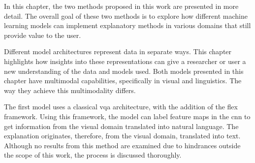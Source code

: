 \label{sec:3_methodology}

In this chapter, the two methods proposed in this work are presented in more detail. The overall goal of these two methods is to explore how different machine learning models can implement explanatory methods in various domains that still provide value to the user. 

Different model architectures represent data in separate ways. 
This chapter highlights how insights into these representations can give a researcher or user a new understanding of the data and models used.
Both models presented in this chapter have multimodal capabilities, specifically in visual and linguistics. The way they achieve this multimodality differs. 

The first model uses a classical \gls{vqa} architecture, with the addition of the \gls{flex} framework. 
Using this framework, the model can label feature maps in the \gls{cnn} to get information from the visual domain translated into natural language. The explanation originates, therefore, from the visual domain, translated into text. Although no results from this method are examined due to hindrances outside the scope of this work, the process is discussed thoroughly.


